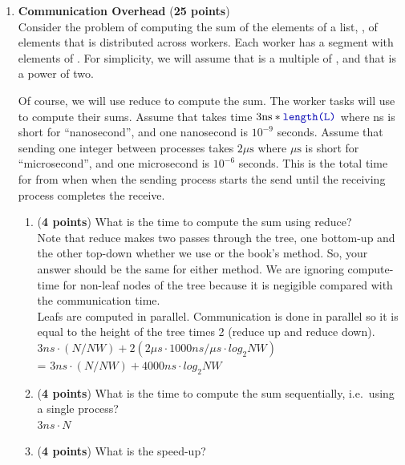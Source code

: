 \documentclass{article}
\newenvironment{answer}
{\color{blue}}
{\normalfont}
\begin{document}
\begin{enumerate}
  \item \textbf{Communication Overhead} (\textbf{25 points})\\
    Consider the problem of computing the sum of the elements of a list, ,
    of  elements that is distributed across  workers.
    Each worker has a segment with  elements of .
    For simplicity, we will assume that   is a multiple of , and
    that  is a power of two.
    \par
    Of course, we will use reduce to compute the sum.
    The worker tasks will use  to compute their sums.
    Assume that  takes time $3\mathrm{ns}*\code{length(L)}$
    where ns is short for ``nanosecond'', and one nanosecond is $10^{-9}$ seconds.
    Assume that sending one integer between processes takes $2\mu\mathrm{s}$
    where $\mu\mathrm{s}$ is short for ``microsecond'',  and one microsecond is $10^{-6}$ seconds.
    This is the total time for from when when the sending process starts the send until the
    receiving process completes the receive.
    \begin{enumerate}
      \item (\textbf{4 points}) What is the time to compute the sum using reduce?\\
	Note that reduce makes two passes through the tree, one bottom-up and the other top-down
	whether we use  or the book's method.  So, your answer should
	be the same for either method.  We are ignoring compute-time for non-leaf nodes of
	the tree because it is negigible compared with the communication time. \\
  \begin{answer}
    Leafs are computed in parallel. Communication is done in parallel so it is equal to the height of the tree times 2 (reduce up and reduce down). \\
    $3ns\cdot(N/NW) + 2(2\mu s \cdot 1000ns/\mu s \cdot log_2NW)$ \\
    = $3ns\cdot(N/NW) + 4000ns \cdot log_2NW$ 
  \end{answer}
      \item (\textbf{4 points}) What is the time to compute the sum sequentially,
	i.e.\ using a single process? \\
      \begin{answer}
        $3ns \cdot N$
      \end{answer}
      \item (\textbf{4 points}) What is the speed-up? \\

\end{enumerate}
\end{enumerate}
\end{document}
